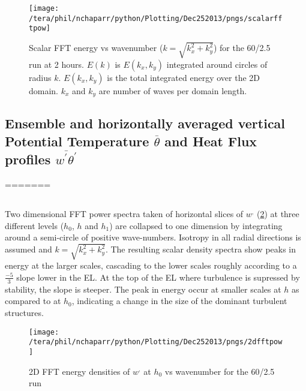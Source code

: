 \begin{figure}[htbp]
    \centering
    \texttt{[image: /tera/phil/nchaparr/python/Plotting/Dec252013/pngs/scalarfftpow]}
    \caption{Scalar FFT  energy vs wavenumber ($k = \sqrt{k_{x}^{2}+k_{y}^{2}}$) for the 60/2.5 run
at 2 hours.  $E(k)$ is $E(k_{x}, k_{y})$ integrated around circles of radius $k$.  
   $E(k_{x}, k_{y})$ is the total integrated energy over the 2D domain.  
   $k_{x}$ and $k_{y}$ are number of waves per domain length.}
    \label{fig:2fftw602point5}   %
\end{figure}

\clearpage

\subsection{Ensemble and horizontally averaged vertical Potential Temperature $\overline{\theta}$ 
and Heat Flux profiles $\overline{w^{'}\theta^{'}}$}
=======
\subsection{}
\FloatBarrier

Two dimensional \acs{FFT} power spectra taken of horizontal slices of $w^{,}$ (\ref{fig:scalardfftw602point5}) at three
different levels ($h_{0}$, $h$ and $h_{1}$) are collapsed to one dimension by integrating around a semi-circle of positive wave-numbers.
Isotropy in all radial directions is assumed and $k = \sqrt{k_{x}^{2} + k_{y}^{2}}$.  The resulting scalar density spectra show peaks in 
energy at the larger scales, cascading to the lower scales roughly according to a $\frac{-5}{3}$ slope lower in the \acs{EL}.  At
the top of the \acs{EL} where turbulence is supressed by stability, the slope is steeper.  The peak in energy occur at smaller scales
at $h$ as compared to at $h_{0}$, indicating a change in the size of the dominant turbulent structures.\\

\begin{figure}[htbp]
    \centering
    \texttt{[image: /tera/phil/nchaparr/python/Plotting/Dec252013/pngs/2dfftpow]}
    \caption{2D FFT energy densities of $w^{,}$ at $h_{0}$ vs wavenumber for the 60/2.5 run}
    \label{fig:scalardfftw602point5}   %
\end{figure}

